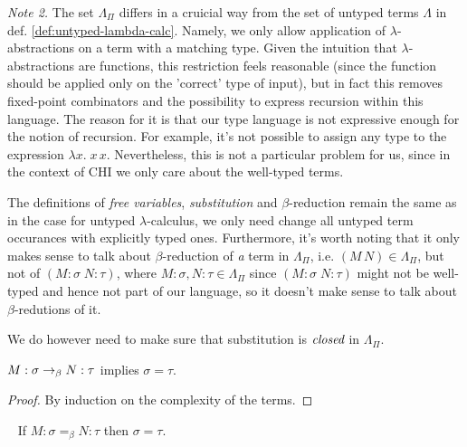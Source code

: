 \emph{Note 2.}
    The set $\Lambda_\Pi$ differs in a cruicial way from the set of
    untyped terms $\Lambda$ in def.  \ref{def:untyped-lambda-calc}.
    Namely, we only allow application of $\lambda$-abstractions on a
    term with a matching type.  Given the intuition that
    $\lambda$-abstractions are functions, this restriction feels
    reasonable (since the function should be applied only on the
    'correct' type of input), but in fact this removes fixed-point
    combinators and the possibility to express recursion within this
    language. The reason for it is that our type language is not
    expressive enough for the notion of recursion. For example, it's
    not possible to assign any type to the expression $\lambda x.\; x\,
    x$. Nevertheless, this is not a particular problem for us, since in
    the context of CHI we only care about the well-typed terms.

The definitions of \emph{free variables}, \emph{substitution} and
$\beta$-reduction remain the same as in the case for untyped
$\lambda$-calculus, we only need change all untyped term occurances with
explicitly typed ones. Furthermore, it's worth noting that it only makes sense
to talk about $\beta$-reduction of \emph{a} term in $\Lambda_\Pi$, i.e. $(M\,
N) \in \Lambda_\Pi$, but not of $(M\!:\!\sigma\; N\!:\!\tau)$, where $M:\sigma, N:\tau
\in \Lambda_\Pi$ since $(M\!:\!\sigma\; N\!:\!\tau)$ might not be well-typed and
hence not part of our language, so it doesn't make sense to talk about
$\beta$-redutions of it.

We do however need to make sure that substitution is $\emph{closed}$ in
$\Lambda_\Pi$.

\begin{proposition}
    $M:\sigma \rightarrow_\beta N:\tau$ implies $\sigma = \tau$.
\end{proposition}
\begin{proof}
    By induction on the complexity of the terms.
\end{proof}

\begin{corollary} {\ }
    If $M:\sigma =_\beta N:\tau$ then $\sigma = \tau$.
\end{corollary}


